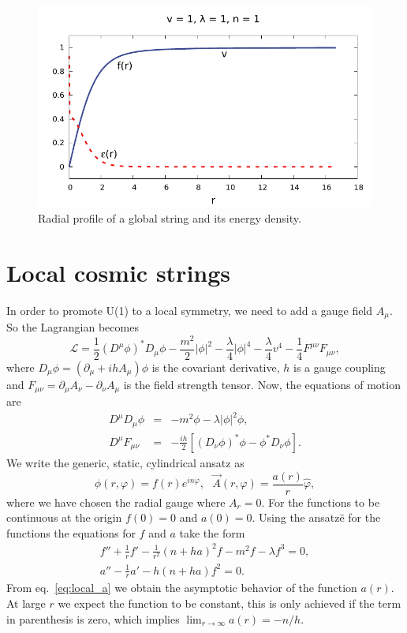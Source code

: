 \begin{figure}
	\centering
		\includegraphics[scale=1]{./figures/global_str.pdf}
	\caption{Radial profile of a global string and its energy density.}
	\label{fig:global_str}
\end{figure}

\section{Local cosmic strings}\label{sec:local}
In order to promote U(1) to a local symmetry, we need to add a gauge field $A_{\mu}$. So the Lagrangian becomes
\begin{equation}
	\mathcal{L} = \frac{1}{2}(D^{\mu} \phi)^* D_{\mu} \phi - \frac{m^2}{2} |\phi|^2 - \frac{\lambda}{4}|\phi|^4 - \frac{\lambda}{4}v^4 - \frac{1}{4}F^{\mu\nu}F_{\mu\nu},
\end{equation}
where $D_{\mu}\phi = (\partial_{\mu} + ihA_{\mu})\phi$ is the covariant derivative, $h$ is a gauge coupling and $F_{\mu\nu} = \partial_{\mu}A_{\nu} - \partial_{\nu}A_{\mu}$ is the field strength tensor. Now, the equations of motion are
\begin{eqnarray}
	D^{\mu}D_{\mu} \phi & = & -m^2 \phi - \lambda|\phi|^2\phi, \\
	D^{\mu}F_{\mu\nu} & = & -\frac{ih}{2}\left[(D_\nu \phi)^* \phi - \phi^* D_{\nu}\phi\right].
\end{eqnarray}
We write the generic, static, cylindrical ansatz as
\begin{equation}
	\phi(r,\varphi) = f(r)e^{in\varphi}, \ \ \ \vec{A}(r,\varphi) = \frac{a(r)}{r}\hat{\varphi},
\end{equation}
where we have chosen the radial gauge where $A_r = 0$. For the functions to be continuous at the origin $f(0) = 0$ and $a(0)=0$.
Using the ansatzë for the functions the equations for $f$ and $a$ take the form
\begin{eqnarray}
	 \label{eq:local_f}
	f'' + \frac{1}{r} f' - \frac{1}{r^2}\left(n+ha\right)^2f- m^2 f- \lambda f^3= 0, \\
	\label{eq:local_a}
	a'' -\frac{1}{r}a'-h(n+ha)f^2= 0.
\end{eqnarray}
From eq.\ \eqref{eq:local_a} we obtain the asymptotic behavior of the function $a(r)$. At large $r$ we expect the function to be constant, this is only achieved if the term in parenthesis is zero, which implies $\lim_{r\to\infty}a(r) = -n/h$.

